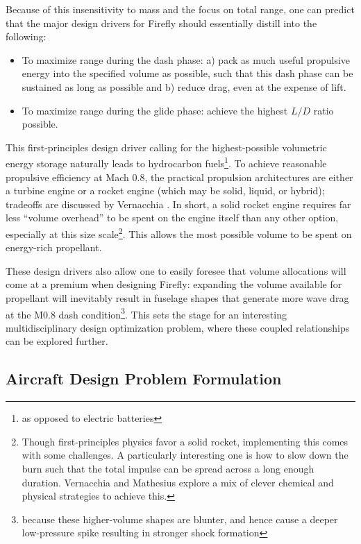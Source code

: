 Because of this insensitivity to mass and the focus on total range, one can predict that the major design drivers for Firefly should essentially distill into the following:
\begin{itemize}[noitemsep]
    \item To maximize range during the dash phase: a) pack as much useful propulsive energy into the specified volume as possible, such that this dash phase can be sustained as long as possible and b) reduce drag, even at the expense of lift.
    \item To maximize range during the glide phase: achieve the highest $L/D$ ratio possible.
\end{itemize}

This first-principles design driver calling for the highest-possible volumetric energy storage naturally leads to hydrocarbon fuels\footnote{as opposed to electric batteries}. To achieve reasonable propulsive efficiency at Mach 0.8, the practical propulsion architectures are either a turbine engine or a rocket engine (which may be solid, liquid, or hybrid); tradeoffs are discussed by Vernacchia \cite{vernacchia_development_2020}. In short, a solid rocket engine requires far less ``volume overhead'' to be spent on the engine itself than any other option, especially at this size scale\footnote{Though first-principles physics favor a solid rocket, implementing this comes with some challenges. A particularly interesting one is how to slow down the burn such that the total impulse can be spread across a long enough duration. Vernacchia \cite{vernacchia_development_2020} and Mathesius \cite{mathesius_integrated_2023, mathesius_firefly_2019} explore a mix of clever chemical and physical strategies to achieve this.}. This allows the most possible volume to be spent on energy-rich propellant.

These design drivers also allow one to easily foresee that volume allocations will come at a premium when designing Firefly: expanding the volume available for propellant will inevitably result in fuselage shapes that generate more wave drag at the M0.8 dash condition\footnote{because these higher-volume shapes are blunter, and hence cause a deeper low-pressure spike resulting in stronger shock formation}. This sets the stage for an interesting multidisciplinary design optimization problem, where these coupled relationships can be explored further.

\subsection{Aircraft Design Problem Formulation}
\label{sec:firefly-mdo}

